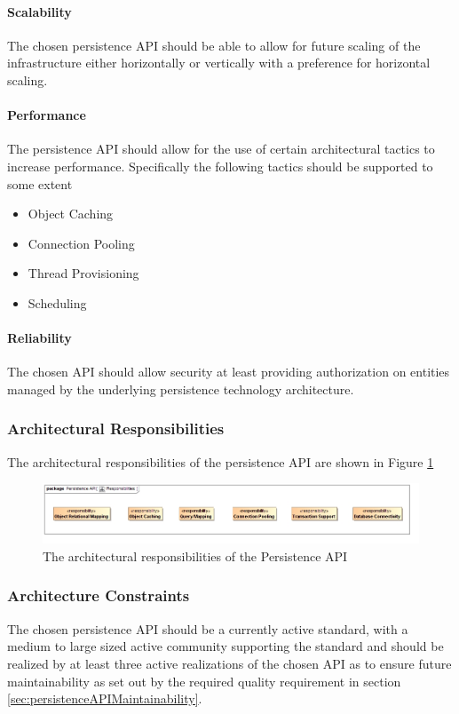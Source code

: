 \paragraph{Scalability}
The chosen persistence API should be able to allow for future scaling of the
infrastructure either horizontally or vertically with a preference for
horizontal scaling.

\paragraph{Performance}
The persistence API should allow for the use of certain architectural tactics
to increase performance. Specifically the following tactics should be supported
to some extent
\begin{itemize}
	\item Object Caching
	\item Connection Pooling
	\item Thread Provisioning
	\item Scheduling
\end{itemize}

\paragraph{Reliability}
The chosen API should allow security at least providing authorization on
entities managed by the underlying persistence technology architecture.

\subsubsection{Architectural Responsibilities}
The architectural responsibilities of the persistence API are shown in
Figure \ref{fig:persistenceResponsibilities}
\begin{figure}[H]
	\begin{center}
	\includegraphics[scale=0.5]{../Diagrams and Charts/Persistence API/Responsibilities.jpg}
	\caption{The architectural responsibilities of the Persistence API}
	\label{fig:persistenceResponsibilities}
	\end{center}
\end{figure}

\subsubsection{Architecture Constraints}
The chosen persistence API should be a currently active standard, with a medium
to large sized active community supporting the standard and should be realized
by at least three active realizations of the chosen API as to ensure future
maintainability as set out by the required quality requirement in
section \ref{sec:persistenceAPIMaintainability}.
\label{sec:persistenceAPIArchitecturalConstraints}

